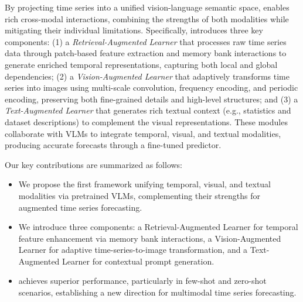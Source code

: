 By projecting time series into a unified vision-language semantic space, \method enables rich cross-modal interactions, combining the strengths of both modalities while mitigating their individual limitations. Specifically, \method introduces three key components: (1) a \textit{Retrieval-Augmented Learner} that processes raw time series data through patch-based feature extraction and memory bank interactions to generate enriched temporal representations, capturing both local and global dependencies; (2) a \textit{Vision-Augmented Learner} that adaptively transforms time series into images using multi-scale convolution, frequency encoding, and periodic encoding, preserving both fine-grained details and high-level structures; and (3) a \textit{Text-Augmented Learner} that generates rich textual context (e.g., statistics and dataset descriptions) to complement the visual representations. These modules collaborate with VLMs to integrate temporal, visual, and textual modalities, producing accurate forecasts through a fine-tuned predictor.

Our key contributions are summarized as follows:

\begin{itemize}[leftmargin=*, itemsep=0pt]
    \item We propose the first framework unifying temporal, visual, and textual modalities via pretrained VLMs, complementing their strengths for augmented time series forecasting.

    \item We introduce three components: a Retrieval-Augmented Learner for temporal feature enhancement via memory bank interactions, a Vision-Augmented Learner for adaptive time-series-to-image transformation, and a Text-Augmented Learner for contextual prompt generation.

    \item \method achieves superior performance, particularly in few-shot and zero-shot scenarios, establishing a new direction for multimodal time series forecasting.
\end{itemize}